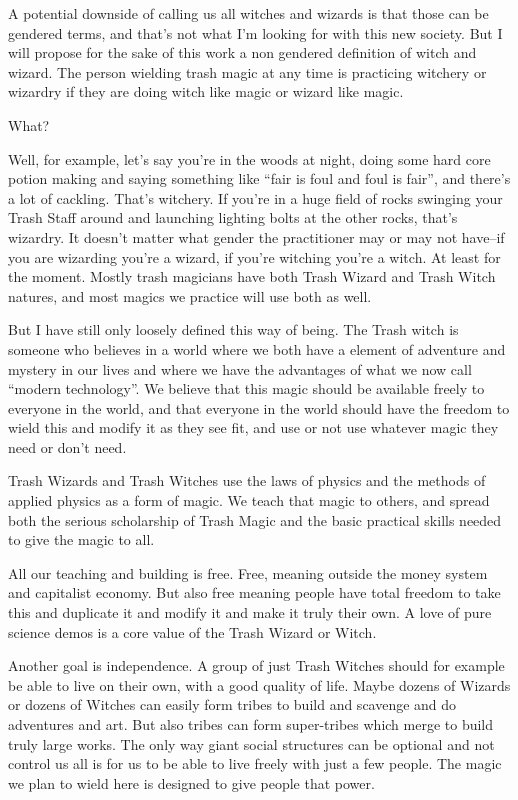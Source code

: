 A potential downside of calling us all witches and wizards is that those
can be gendered terms, and that's not what I'm looking for with this new
society. But I will propose for the sake of this work a non gendered
definition of witch and wizard. The person wielding trash magic at any
time is practicing witchery or wizardry if they are doing witch like
magic or wizard like magic.

What?

Well, for example, let's say you're in the woods at night, doing some
hard core potion making and saying something like ``fair is foul and
foul is fair'', and there's a lot of cackling. That's witchery. If
you're in a huge field of rocks swinging your Trash Staff around and
launching lighting bolts at the other rocks, that's wizardry. It doesn't
matter what gender the practitioner may or may not have--if you are
wizarding you're a wizard, if you're witching you're a witch. At least
for the moment. Mostly trash magicians have both Trash Wizard and Trash
Witch natures, and most magics we practice will use both as well.

But I have still only loosely defined this way of being. The Trash witch
is someone who believes in a world where we both have a element of
adventure and mystery in our lives and where we have the advantages of
what we now call ``modern technology''. We believe that this magic
should be available freely to everyone in the world, and that everyone
in the world should have the freedom to wield this and modify it as they
see fit, and use or not use whatever magic they need or don't need.

Trash Wizards and Trash Witches use the laws of physics and the methods
of applied physics as a form of magic. We teach that magic to others,
and spread both the serious scholarship of Trash Magic and the basic
practical skills needed to give the magic to all.

All our teaching and building is free. Free, meaning outside the money
system and capitalist economy. But also free meaning people have total
freedom to take this and duplicate it and modify it and make it truly
their own. A love of pure science demos is a core value of the Trash
Wizard or Witch.

Another goal is independence. A group of just Trash Witches should for
example be able to live on their own, with a good quality of life. Maybe
dozens of Wizards or dozens of Witches can easily form tribes to build
and scavenge and do adventures and art. But also tribes can form
super-tribes which merge to build truly large works. The only way giant
social structures can be optional and not control us all is for us to be
able to live freely with just a few people. The magic we plan to wield
here is designed to give people that power.

